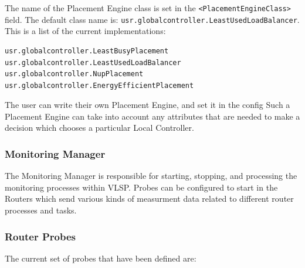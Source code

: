 The name of the Placement Engine class is set in the
\texttt{<PlacementEngineClass>} field.
The default class name is: \texttt{usr.globalcontroller.LeastUsedLoadBalancer}.
This is a list of the current implementations:

\begin{adjustwidth}{\parindent}{} %
\begin{verbatim}
usr.globalcontroller.LeastBusyPlacement
usr.globalcontroller.LeastUsedLoadBalancer
usr.globalcontroller.NupPlacement
usr.globalcontroller.EnergyEfficientPlacement
\end{verbatim}
\end{adjustwidth}


\noindent The user can write their own Placement Engine, and set it in the
config  Such a Placement Engine can take into account any attributes
that are needed to make a decision 
which chooses a particular Local Controller.

\subsubsection{Monitoring Manager}

The Monitoring Manager is responsible for starting, stopping, and
processing the monitoring processes within VLSP.
Probes can be configured to start in the Routers which send various
kinds of measurment data related to different router processes and
tasks.

\subsubsection*{Router Probes}

The current set of probes that have been defined are:


